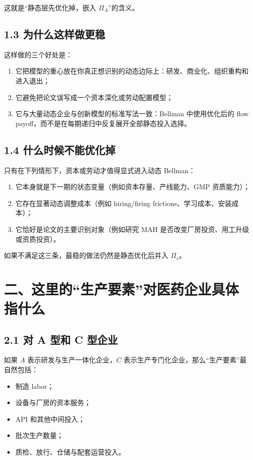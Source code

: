 \documentclass[12pt,fontset=none]{ctexart}
\begin{document}
这就是“静态层先优化掉，嵌入 \(\Pi_A\)”的含义。

\subsection{1.3 为什么这样做更稳}

这样做的三个好处是：

\begin{enumerate}[leftmargin=2em]
    \item 它把模型的重心放在你真正想识别的动态边际上：研发、商业化、组织重构和进入退出；
    \item 它避免把论文误写成一个资本深化或劳动配置模型；
    \item 它与大量动态企业与创新模型的标准写法一致：Bellman 中使用优化后的 flow payoff，而不是在每期递归中反复展开全部静态投入选择。
\end{enumerate}

\subsection{1.4 什么时候不能优化掉}

只有在下列情形下，资本或劳动才值得显式进入动态 Bellman：

\begin{enumerate}[leftmargin=2em]
    \item 它本身就是下一期的状态变量（例如资本存量、产线能力、GMP 资质能力）；
    \item 它存在显著动态调整成本（例如 hiring/firing frictions、学习成本、安装成本）；
    \item 它恰好是论文的主要识别对象（例如研究 MAH 是否改变厂房投资、用工升级或资质投资）。
\end{enumerate}

如果不满足这三条，最稳的做法仍然是静态优化后并入 \(\Pi_s\)。

\section{二、这里的“生产要素”对医药企业具体指什么}

\subsection{2.1 对 A 型和 C 型企业}

如果 \(A\) 表示研发与生产一体化企业，\(C\) 表示生产专门化企业，那么“生产要素”最自然包括：

\begin{itemize}[leftmargin=2em]
    \item 制造 labor；
    \item 设备与厂房的资本服务；
    \item API 和其他中间投入；
    \item 批次生产数量；
    \item 质检、放行、仓储与配套运营投入。
\end{itemize}
\end{document}
